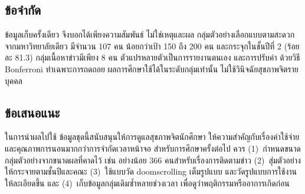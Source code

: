 \subsection{ข้อจำกัด}

ข้อมูลเก็บครั้งเดียว จึงบอกได้เพียงความสัมพันธ์ ไม่ใช่เหตุและผล
กลุ่มตัวอย่างเลือกแบบตามสะดวกจากมหาวิทยาลัยเดียว มีจำนวน 107 คน น้อยกว่าเป้า 150 ถึง 200 คน
และกระจุกในชั้นปีที่ 2 (ร้อยละ 81.3) กลุ่มเนื้อหาข่าวมีเพียง 8 คน
ตัวแปรหลายตัวเป็นการรายงานตนเอง และการปรับค่า  ด้วยวิธี Bonferroni ทำเฉพาะการถดถอย
ผลการศึกษาใช้ได้ในระดับกลุ่มเท่านั้น ไม่ใช้วินิจฉัยสุขภาพจิตรายบุคคล

\subsection{ข้อเสนอแนะ}

ในการนำผลไปใช้ ข้อมูลชุดนี้สนับสนุนให้การดูแลสุขภาพจิตนักศึกษา
ให้ความสำคัญกับเรื่องค่าใช้จ่ายและคุณภาพการนอนมากกว่าการจำกัดเวลาหน้าจอ
สำหรับการศึกษาครั้งต่อไป ควร
(1)~กำหนดขนาดกลุ่มตัวอย่างจากขนาดผลที่คาดไว้ เช่น อย่างน้อย 366 คนสำหรับเรื่องการติดตามข่าว
(2)~สุ่มตัวอย่างให้กระจายตามชั้นปีและคณะ
(3)~ใช้แบบวัด doomscrolling เต็มรูปแบบ และวัดรูปแบบการใช้งานให้ละเอียดขึ้น
และ (4)~เก็บข้อมูลกลุ่มเดิมซ้ำหลายช่วงเวลา เพื่อดูว่าพฤติกรรมหรืออาการเกิดก่อน
